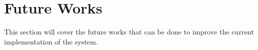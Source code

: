 \section{Future Works}\label{sec:future-works}
This section will cover the future works that can be done to improve the current implementation of the system.


